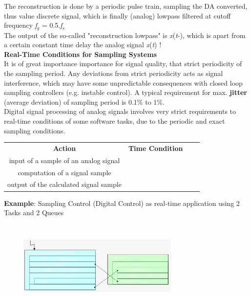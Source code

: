 The reconstruction is done by a periodic pulse train, sampling the DA converted, thus value discrete signal, which is finally (analog) lowpass filtered at cutoff frequency \textit{f}${}_{g}$ = 0.5$.$\textit{f}${}_{s}$\\ 

The output of the so-called "reconstruction lowpass" is \textit{x}(\textit{t}-), which is apart from a certain constant time delay  the analog signal \textit{x}(\textit{t}) !\\

{\rot\bf Real-Time Conditions for Sampling Systems}\\

It is of great importance importance for signal quality, that strict periodicity of the sampling period. Any deviations from strict periodicity acts as signal interference, which may have some unpredictable consequences with closed loop sampling controllers (e.g. instable control). A typical requirement for max. \textbf{jitter} (average deviation) of sampling period is 0.1\% to 1\%.\\

Digital signal processing of analog signals involves very strict requirements to real-time conditions of some software tasks, due to the periodic and exact sampling conditions.

\begin{table}[h!]
\setlength{\tabcolsep}{10pt} %
\renewcommand{\arraystretch}{1.5} %
\small
\centering
 \begin{tabular}{|c|c|c|c|} \hline
 \textbf{Action} & \textbf{Time Condition} \\ [0.1ex] 
input of a sample of an analog signal &  \\ \hline 
computation of a signal sample &  \\ \hline 
output of the calculated signal sample &  \\ \hline 
 \end{tabular}
 \label{Intrinsic}
\end{table}

\textbf{ Example}: Sampling Control (Digital Control) as real-time application using 2 Tasks and 2 Queues

    \begin{figure}[h]
    \centering
    \includegraphics[width=8cm, height=4.5cm]{Images/image139.png}
    \label{fig:Fig }
    \end{figure}

